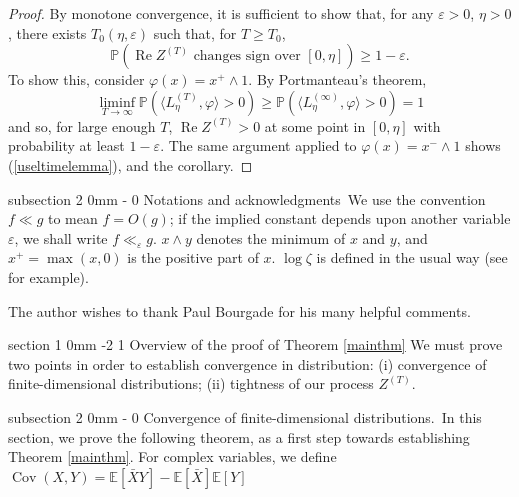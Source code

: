 \documentclass{article}
\makeatletter
\DeclareMathOperator{\Cov}{Cov}
\newcommand{\phe}{\varphi}
\newcommand{\Proba}{\mathbb{P}}
\DeclareMathOperator{\Rea}{Re}
\newcommand{\1}{\mathds{1}}
\numberwithin{equation}{section}
\newcommand{\eps}{\varepsilon}
\renewcommand{\geq}{\geqslant}
\theoremstyle{plain} %
\renewcommand{\subsection}{\@startsection
{subsection}%
{2}%
{0mm}%
{-\baselineskip}%
{0 \baselineskip}%
{\normalfont\bf\itshape}} %
\renewcommand{\section}{\@startsection
{section}%
{1}%
{0mm}%
{-2\baselineskip}%
{1\baselineskip}%
{\normalfont\large\scshape\centering}} %
\makeatother
\begin{document}
\begin{proof}
    By monotone convergence, it is sufficient to show that, for any $\eps > 0$, $\eta > 0$, there exists $T_0(\eta, \eps)$ such that, for $T \geq T_0$, 
    \begin{equation}
    \label{useltimelemma}
        \Proba(\Rea Z^{(T)} \text{ changes sign over }[0, \eta]) \geq 1-\eps.
    \end{equation}
    To show this, consider $\phe(x) = x^+ \land 1$. By Portmanteau's theorem,
    \begin{equation}
        \liminf_{T \to \infty} \Proba(\langle L_\eta^{(T)}, \phe \rangle > 0) \geq \Proba(\langle L^{(\infty)}_{\eta}, \phe \rangle > 0) = 1
    \end{equation}
    and so, for large enough $T$, $\Rea Z^{(T)} > 0$ at some point in $[0, \eta]$ with probability at least $1 - \eps$. 
    The same argument applied to $\phe(x) = x^- \land 1$ shows (\ref{useltimelemma}), and the corollary.
\end{proof}

\subsection{Notations and acknowledgments}\ 
We use the convention $f \ll g$ to mean $f = O(g)$; if the implied constant depends upon another variable $\eps$, we shall write $f \ll_\eps g$. $x \land y$ denotes the minimum of $x$ and $y$, and $x^+ = \max(x, 0)$ is the positive part of $x$. $\log \zeta$ is defined in the usual way (see \cite{Sel1946} for example).

The author wishes to thank Paul Bourgade for his many helpful comments.

\section{Overview of the proof of Theorem \ref{mainthm}}
We must prove two points in order to establish convergence in distribution:
(i)
    convergence of finite-dimensional distributions;
(ii)  tightness of our process $Z^{(T)}$.

\subsection{Convergence of finite-dimensional distributions.}\ 
In this section, we prove the following theorem, as a first step towards establishing Theorem \ref{mainthm}.  For complex variables, we define $ \Cov(X,Y)=\mathbb{E}[{\bar X}Y]-\mathbb{E}[{\bar X}]\mathbb{E}[Y]$
\end{document}
